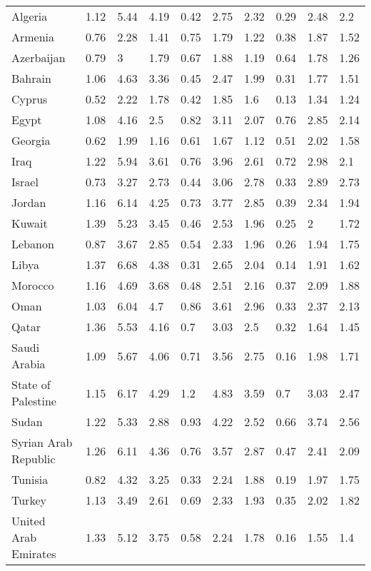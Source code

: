 \begin{longtable}[t]{llllllllll}
Algeria & 1.12 & 5.44 & 4.19 & 0.42 & 2.75 & 2.32 & 0.29 & 2.48 & 2.2\\
Armenia & 0.76 & 2.28 & 1.41 & 0.75 & 1.79 & 1.22 & 0.38 & 1.87 & 1.52\\
Azerbaijan & 0.79 & 3 & 1.79 & 0.67 & 1.88 & 1.19 & 0.64 & 1.78 & 1.26\\
Bahrain & 1.06 & 4.63 & 3.36 & 0.45 & 2.47 & 1.99 & 0.31 & 1.77 & 1.51\\
Cyprus & 0.52 & 2.22 & 1.78 & 0.42 & 1.85 & 1.6 & 0.13 & 1.34 & 1.24\\
Egypt & 1.08 & 4.16 & 2.5 & 0.82 & 3.11 & 2.07 & 0.76 & 2.85 & 2.14\\
Georgia & 0.62 & 1.99 & 1.16 & 0.61 & 1.67 & 1.12 & 0.51 & 2.02 & 1.58\\
Iraq & 1.22 & 5.94 & 3.61 & 0.76 & 3.96 & 2.61 & 0.72 & 2.98 & 2.1\\
Israel & 0.73 & 3.27 & 2.73 & 0.44 & 3.06 & 2.78 & 0.33 & 2.89 & 2.73\\
Jordan & 1.16 & 6.14 & 4.25 & 0.73 & 3.77 & 2.85 & 0.39 & 2.34 & 1.94\\
Kuwait & 1.39 & 5.23 & 3.45 & 0.46 & 2.53 & 1.96 & 0.25 & 2 & 1.72\\
Lebanon & 0.87 & 3.67 & 2.85 & 0.54 & 2.33 & 1.96 & 0.26 & 1.94 & 1.75\\
Libya & 1.37 & 6.68 & 4.38 & 0.31 & 2.65 & 2.04 & 0.14 & 1.91 & 1.62\\
Morocco & 1.16 & 4.69 & 3.68 & 0.48 & 2.51 & 2.16 & 0.37 & 2.09 & 1.88\\
Oman & 1.03 & 6.04 & 4.7 & 0.86 & 3.61 & 2.96 & 0.33 & 2.37 & 2.13\\
Qatar & 1.36 & 5.53 & 4.16 & 0.7 & 3.03 & 2.5 & 0.32 & 1.64 & 1.45\\
Saudi Arabia & 1.09 & 5.67 & 4.06 & 0.71 & 3.56 & 2.75 & 0.16 & 1.98 & 1.71\\
State of Palestine & 1.15 & 6.17 & 4.29 & 1.2 & 4.83 & 3.59 & 0.7 & 3.03 & 2.47\\
Sudan & 1.22 & 5.33 & 2.88 & 0.93 & 4.22 & 2.52 & 0.66 & 3.74 & 2.56\\
Syrian Arab Republic & 1.26 & 6.11 & 4.36 & 0.76 & 3.57 & 2.87 & 0.47 & 2.41 & 2.09\\
Tunisia & 0.82 & 4.32 & 3.25 & 0.33 & 2.24 & 1.88 & 0.19 & 1.97 & 1.75\\
Turkey & 1.13 & 3.49 & 2.61 & 0.69 & 2.33 & 1.93 & 0.35 & 2.02 & 1.82\\
United Arab Emirates & 1.33 & 5.12 & 3.75 & 0.58 & 2.24 & 1.78 & 0.16 & 1.55 & 1.4\\

\end{longtable}
